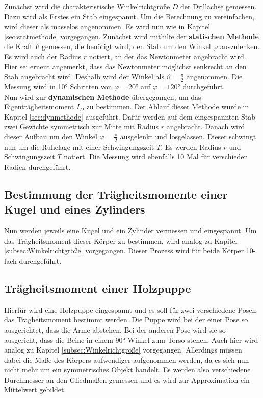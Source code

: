 Zunächst wird die charakteristische Winkelrichtgröße $D$ der Drillachse gemessen.
Dazu wird als Erstes ein Stab eingespannt.
Um die Berechnung zu vereinfachen, wird dieser als masselos angenommen.
Es wird nun wie in Kapitel \ref{sec:statmethode} vorgegangen.
Zunächst wird mithilfe der \textbf{statischen Methode} die Kraft $F$ gemessen, die benötigt wird,
den Stab um den Winkel $\varphi$ auszulenken.
Es wird auch der Radius $r$ notiert, an der das Newtonmeter angebracht wird.
Hier sei erneut angemerkt, dass das Newtonmeter möglichst senkrecht an den Stab angebracht wird.
Deshalb wird der Winkel als $\vartheta = \frac{\pi}{2}$ angenommen.
Die Messung wird in 10° Schritten von $\varphi = 20°$ auf $\varphi = 120°$ durchgeführt. \\

Nun wird zur \textbf{dynamischen Methode} übergegangen, um das Eigenträgheitsmoment $I_{D}$ zu bestimmen.
Der Ablauf dieser Methode wurde in Kapitel \ref{sec:dynmethode} ausgeführt.
Dafür werden auf dem eingespannten Stab zwei Gewichte symmetrisch zur Mitte mit Radius $r$ angebracht.
Danach wird dieser Aufbau um den Winkel $\varphi = \frac{\pi}{2}$ ausgelenkt und losgelassen.
Dieser schwingt nun um die Ruhelage mit einer Schwingungszeit $T$.
Es werden Radius $r$ und Schwingungszeit $T$ notiert.
Die Messung wird ebenfalls 10 Mal für verschieden Radien durchgeführt.


\subsection{Bestimmung der Trägheitsmomente einer Kugel und eines Zylinders}
Nun werden jeweils eine Kugel und ein Zylinder vermessen und eingespannt.
Um das Trägheitsmoment dieser Körper zu bestimmen, wird analog zu Kapitel \ref{subsec:Winkelrichtgröße} vorgegangen.
Dieser Prozess wird für beide Körper 10-fach durchgeführt.

\subsection{Trägheitsmoment einer Holzpuppe}
Hierfür wird eine Holzpuppe eingespannt und es soll für zwei verschiedene Posen das Trägheitsmoment bestimmt werden.
Die Puppe wird bei der einer Pose so ausgerichtet, dass die Arme abstehen.
Bei der anderen Pose wird sie so ausgericht, dass die Beine in einem 90° Winkel zum Torso stehen.
Auch hier wird analog zu Kapitel \ref{subsec:Winkelrichtgröße} vorgegangen.
Allerdings müssen dabei die Maße des Körpers aufwendiger aufgenommen werden, da es sich nun nicht mehr um ein symmetrisches Objekt handelt.
Es werden also verschiedene Durchmesser an den Gliedmaßen gemessen und es wird zur Approximation ein Mittelwert gebildet.